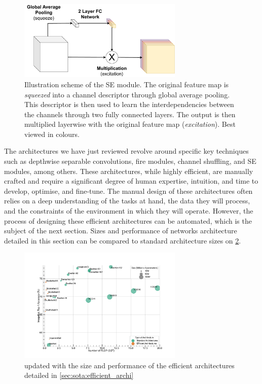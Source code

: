 
\begin{figure}[htbp]
    \centering
    \includegraphics[width=0.70\textwidth]{chapter_sota/assets/SE_module.pdf}
    \caption{Illustration scheme of the \acf{SE} module. The original feature
    map is \emph{squeezed} into a channel descriptor through global average
    pooling. This descriptor is then used to learn the interdependencies between
    the channels through two fully connected layers. The output is then
    multiplied layerwise with the original feature map (\emph{excitation}). Best
    viewed in colours.}
    \label{fig:sota:se_module}
\end{figure}


The architectures we have just reviewed revolve around specific key techniques
such as depthwise separable convolutions, fire modules, channel shuffling, and
\ac{SE} modules, among others. These architectures, while highly efficient, are
manually crafted and require a significant degree of human expertise, intuition,
and time to develop, optimise, and fine-tune. The manual design of these
architectures often relies on a deep understanding of the tasks at hand, the
data they will process, and the constraints of the environment in which they
will operate. However, the process of designing these efficient architectures
can be automated, which is the subject of the next section. Sizes and
performance of networks architecture detailed in this section can be compared to
standard architecture sizes on \cref{fig:sota:net_sizes_std_eff}.\\

\begin{figure}[htbp]
    \centering
    \includegraphics[width=0.70\textwidth]{chapter_sota/assets/network_sizes_normal_eff.pdf}
    \caption{ updated with the size and performance of the efficient
    architectures detailed in \cref{sec:sota:efficient_archi}}
    \label{fig:sota:net_sizes_std_eff}
\end{figure}




